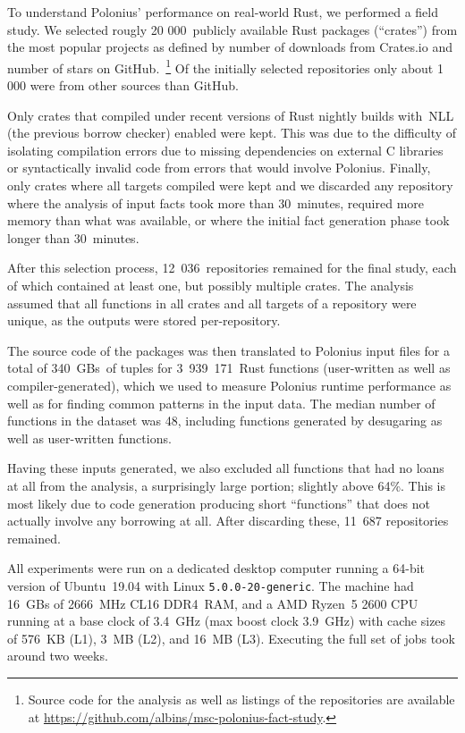 \documentclass[11pt,a4paper,twoside,openany,draft]{report}
\begin{document}
To understand Polonius' performance on real-world Rust, we performed a field
study. We selected rougly 20 000~publicly available Rust packages (``crates'')
from the most popular projects as defined by number of downloads from Crates.io
and number of stars on GitHub.~\footnote{Source code for the analysis as well as
  listings of the repositories are available at
  \url{https://github.com/albins/msc-polonius-fact-study}.} Of the initially selected repositories only about 1 000 were from other sources
than GitHub.

Only crates that compiled under recent versions of Rust nightly builds with~NLL
(the previous borrow checker) enabled were kept. This was due to the difficulty
of isolating compilation errors due to missing dependencies on external C
libraries or syntactically invalid code from errors that would involve Polonius.
Finally, only crates where all targets compiled were kept and we discarded any
repository where the analysis of input facts took more than 30~minutes, required
more memory than what was available, or where the initial fact generation phase
took longer than 30~minutes.

After this selection process, 12~036~repositories remained for the final study,
each of which contained at least one, but possibly multiple crates. The analysis
assumed that all functions in all crates and all targets of a repository were
unique, as the outputs were stored per-repository.

The source code of the packages was then translated to Polonius input files for
a total of 340~GBs~of tuples for 3~939~171~Rust functions (user-written as well
as compiler-generated), which we used to measure Polonius runtime performance as
well as for finding common patterns in the input data. The median number of
functions in the dataset was 48, including functions generated by desugaring as
well as user-written functions.

Having these inputs generated, we also excluded all functions that had no loans
at all from the analysis, a surprisingly large portion; slightly above 64\%.
This is most likely due to code generation producing short ``functions'' that
does not actually involve any borrowing at all. After discarding these, 11~687
repositories remained.

All experiments were run on a dedicated desktop computer running a 64-bit
version of Ubuntu~19.04 with Linux \texttt{5.0.0-20-generic}. The machine had
16~GBs of 2666~MHz CL16 DDR4~RAM, and a AMD Ryzen~5 2600 CPU running at a base
clock of 3.4~GHz (max boost clock 3.9~GHz) with cache sizes of 576~KB (L1), 3~MB
(L2), and 16~MB (L3). Executing the full set of jobs took around two weeks.
\end{document}
